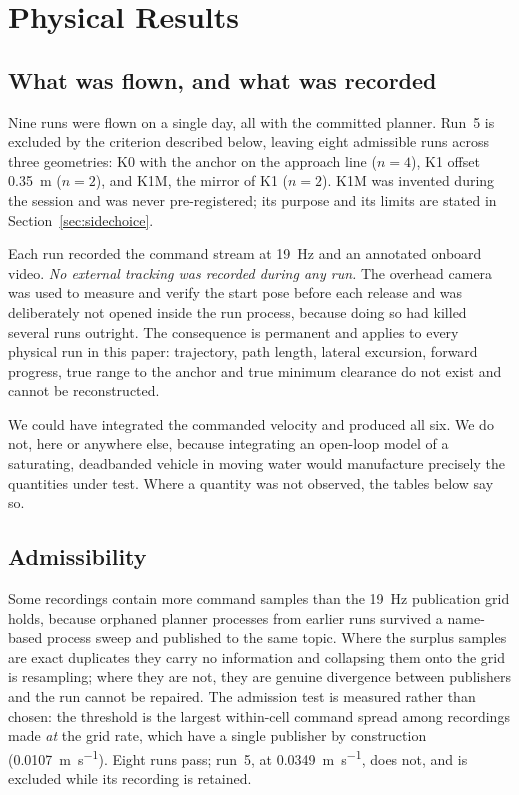 \section{Physical Results \realmark}
\label{sec:realresults}

\subsection{What was flown, and what was recorded}

Nine runs were flown on a single day, all with the committed planner.
Run~5 is excluded by the criterion described below, leaving eight
admissible runs across three geometries: \textsf{K0} with the anchor on
the approach line ($n=4$), \textsf{K1} offset \SI{0.35}{\metre} ($n=2$),
and \textsf{K1M}, the mirror of \textsf{K1} ($n=2$). \textsf{K1M} was
invented during the session and was never pre-registered; its purpose
and its limits are stated in Section~\ref{sec:sidechoice}.

Each run recorded the command stream at \SI{19}{\hertz} and an annotated
onboard video. \emph{No external tracking was recorded during any run.}
The overhead camera was used to measure and verify the start pose before
each release and was deliberately not opened inside the run process,
because doing so had killed several runs outright. The consequence is
permanent and applies to every physical run in this paper: trajectory,
path length, lateral excursion, forward progress, true range to the
anchor and true minimum clearance do not exist and cannot be
reconstructed.

We could have integrated the commanded velocity and produced all six.
We do not, here or anywhere else, because integrating an open-loop model
of a saturating, deadbanded vehicle in moving water would manufacture
precisely the quantities under test. Where a quantity was not observed,
the tables below say so.

\subsection{Admissibility}

Some recordings contain more command samples than the \SI{19}{\hertz}
publication grid holds, because orphaned planner processes from earlier
runs survived a name-based process sweep and published to the same
topic. Where the surplus samples are exact duplicates they carry no
information and collapsing them onto the grid is resampling; where they
are not, they are genuine divergence between publishers and the run
cannot be repaired. The admission test is measured rather than chosen:
the threshold is the largest within-cell command spread among recordings
made \emph{at} the grid rate, which have a single publisher by
construction (\SI{0.0107}{\metre\per\second}). Eight runs pass; run~5,
at \SI{0.0349}{\metre\per\second}, does not, and is excluded while its
recording is retained.

